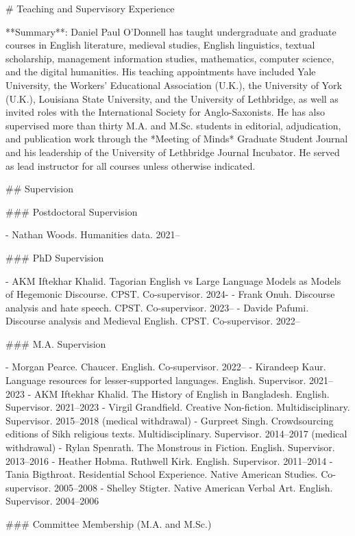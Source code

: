 \sectionbreak{}
# Teaching and Supervisory Experience

**Summary**: Daniel Paul O’Donnell has taught undergraduate and graduate courses in English literature, medieval studies, English linguistics, textual scholarship, management information studies, mathematics, computer science, and the digital humanities. His teaching appointments have included Yale University, the Workers’ Educational Association (U.K.), the University of York (U.K.), Louisiana State University, and the University of Lethbridge, as well as invited roles with the International Society for Anglo-Saxonists. He has also supervised more than thirty M.A. and M.Sc. students in editorial, adjudication, and publication work through the *Meeting of Minds* Graduate Student Journal and his leadership of the University of Lethbridge Journal Incubator. He served as lead instructor for all courses unless otherwise indicated.

\sectionbreak{}
## Supervision

\sectionbreak{}
### Postdoctoral Supervision

- Nathan Woods. Humanities data. 2021–

\sectionbreak{}
### PhD Supervision

- AKM Iftekhar Khalid. Tagorian English vs Large Language Models as Models of Hegemonic Discourse. CPST. Co-supervisor. 2024-
- Frank Onuh. Discourse analysis and hate speech. CPST. Co-supervisor. 2023–
- Davide Pafumi. Discourse analysis and Medieval English. CPST. Co-supervisor. 2022–

\sectionbreak{}
### M.A. Supervision

- Morgan Pearce. Chaucer. English. Co-supervisor. 2022–
- Kirandeep Kaur. Language resources for lesser-supported languages. English. Supervisor. 2021–2023
- AKM Iftekhar Khalid. The History of English in Bangladesh. English. Supervisor. 2021–2023
- Virgil Grandfield. Creative Non-fiction. Multidisciplinary. Supervisor. 2015–2018 (medical withdrawal)
- Gurpreet Singh. Crowdsourcing editions of Sikh religious texts. Multidisciplinary. Supervisor. 2014–2017 (medical withdrawal)
- Rylan Spenrath. The Monstrous in Fiction. English. Supervisor. 2013–2016
- Heather Hobma. Ruthwell Kirk. English. Supervisor. 2011–2014
- Tania Bigthroat. Residential School Experience. Native American Studies. Co-supervisor. 2005–2008
- Shelley Stigter. Native American Verbal Art. English. Supervisor. 2004–2006

### Committee Membership (M.A. and M.Sc.)

